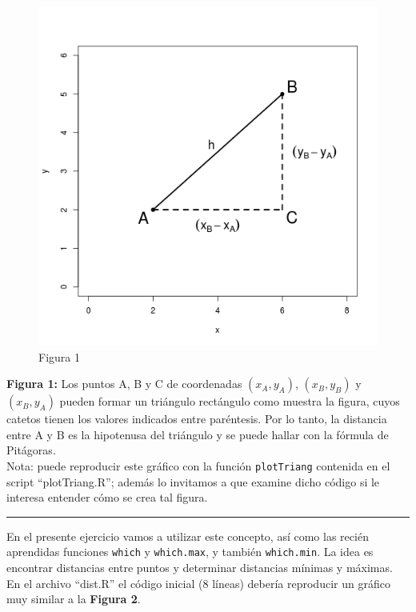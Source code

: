 \documentclass[]{article}
\makeatletter
\def\maxwidth{\ifdim\Gin@nat@width>\linewidth\linewidth
\else\Gin@nat@width\fi}
\let\Oldincludegraphics\includegraphics
\renewcommand{\includegraphics}[1]{\Oldincludegraphics[width=\maxwidth]{#1}}
\makeatother
\begin{document}
\begin{figure}[htbp]
\centering
\includegraphics{figure/unnamed-chunk-10.png}
\caption{Figura 1}
\end{figure}

\textbf{Figura 1:} Los puntos A, B y C de coordenadas $(x_A, y_A)$,
$(x_B, y_B)$ y $(x_B, y_A)$ pueden formar un triángulo rectángulo como
muestra la figura, cuyos catetos tienen los valores indicados entre
paréntesis. Por lo tanto, la distancia entre A y B es la hipotenusa del
triángulo y se puede hallar con la fórmula de Pitágoras.\\Nota: puede
reproducir este gráfico con la función \texttt{plotTriang} contenida en
el script ``plotTriang.R''; además lo invitamos a que examine dicho
código si le interesa entender cómo se crea tal figura.

\begin{center}\rule{3in}{0.4pt}\end{center}

En el presente ejercicio vamos a utilizar este concepto, así como las
recién aprendidas funciones \texttt{which} y \texttt{which.max}, y
también \texttt{which.min}. La idea es encontrar distancias entre puntos
y determinar distancias mínimas y máximas. En el archivo ``dist.R'' el
código inicial (8 líneas) debería reproducir un gráfico muy similar a la
\textbf{Figura 2}.
\end{document}
